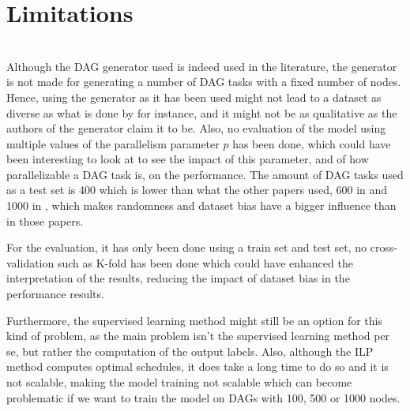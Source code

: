 \section{Limitations}
~
\\


Although the DAG generator used is indeed used in the literature\cite{Lee2021GlobalDagSchedDRL}\cite{zhao2020DAGsched}\cite{Zhao2022DAGsched},
the generator is not made for generating a number of DAG tasks
with a fixed number of nodes. Hence, 
using the generator as it has been used might not
lead to a dataset as diverse as what is done by \citet{Zhao2024GATDRLmodel} for instance,
and it might not be as qualitative as the authors of the generator claim it to be.
Also, no evaluation of the model using multiple values of the parallelism
parameter $p$ has been done, which could have been interesting 
to look at to see the impact of this parameter, and of how parallelizable 
a DAG task is, on the performance.
The amount of DAG tasks used as a test set is 400 which 
is lower than what the other papers used, 600 in \citet{Zhao2024GATDRLmodel}
and 1000 in \citet{Lee2021GlobalDagSchedDRL}, which makes randomness
and dataset bias have a bigger influence than in those papers.

For the evaluation, 
it has only been done using a train set and test set,
no cross-validation such as K-fold has been done which could have
enhanced the interpretation of the results, reducing the impact
of dataset bias in the performance results.

Furthermore, 
the supervised learning method might still be an option
for this kind of problem, as the main problem isn't the supervised
learning method per se, but rather the computation of the output labels. 
Also, although the ILP method computes
optimal schedules, it does take a long time to do so and it is not scalable,
making the model training not scalable which can
become problematic if we want to train the model
on DAGs with 100, 500 or 1000 nodes.
